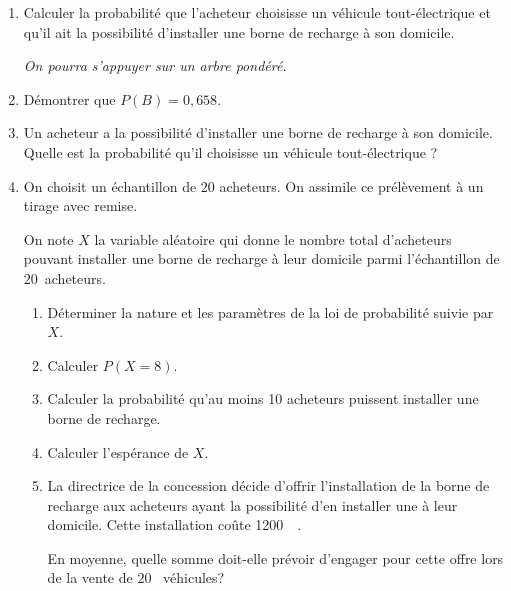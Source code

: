 \documentclass[10pt]{article}
\providecommand{\euro}{\texteuro}
\providecommand{\np}[2][]{{#2~#1}}
\providecommand{\euro}{{\text{€}}}
\renewcommand{\euro}{\ifmmode\text{\texteuro}\else\texteuro\fi}
\begin{document}
\begin{enumerate}
\item Calculer la probabilité que l'acheteur choisisse un véhicule tout-électrique et qu'il ait la possibilité d'installer une borne de recharge à son domicile.

\emph{On pourra s'appuyer sur un arbre pondéré.}
\item Démontrer que $P(B) = 0,658$.
\item Un acheteur a la possibilité d'installer une borne de recharge à son domicile. Quelle
est la probabilité qu'il choisisse un véhicule tout-électrique ?
\item On choisit un échantillon de $20$ acheteurs. On assimile ce prélèvement à un tirage avec remise.

On note $X$ la variable aléatoire qui donne le nombre total d'acheteurs pouvant installer une borne de recharge à leur domicile parmi l'échantillon de $20$~acheteurs.
	\begin{enumerate}
		\item Déterminer la nature et les paramètres de la loi de probabilité suivie par $X$.
		\item Calculer $P(X = 8)$.
		\item Calculer la probabilité qu'au moins 10 acheteurs puissent installer une borne de recharge.
		\item Calculer l'espérance de $X$.
		\item La directrice de la concession décide d'offrir l'installation de la borne de recharge aux acheteurs ayant la possibilité d'en installer une à leur domicile. Cette installation coûte \np{1200}~\euro.
		
En moyenne, quelle somme doit-elle prévoir d'engager pour cette offre lors de la vente de $20$ ~véhicules?
	\end{enumerate}
\end{enumerate}
\end{document}
